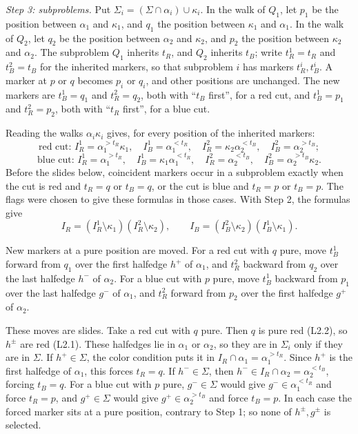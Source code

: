 \documentclass[
  11pt,
]{article}
\newcounter{none} %
\begin{document}
\emph{Step 3: subproblems.} Put
\(\Sigma_i=(\Sigma\cap\alpha_i)\cup\kappa_i\). In the walk of \(Q_1\),
let \(p_1\) be the position between \(\alpha_1\) and \(\kappa_1\), and
\(q_1\) the position between \(\kappa_1\) and \(\alpha_1\). In the walk
of \(Q_2\), let \(q_2\) be the position between \(\alpha_2\) and
\(\kappa_2\), and \(p_2\) the position between \(\kappa_2\) and
\(\alpha_2\). The subproblem \(Q_1\) inherits \(t_R\), and \(Q_2\)
inherits \(t_B\); write \(t_R^1=t_R\) and \(t_B^2=t_B\) for the
inherited markers, so that subproblem \(i\) has markers \(t_R^i,t_B^i\).
A marker at \(p\) or \(q\) becomes \(p_i\) or \(q_i\), and other
positions are unchanged. The new markers are \(t_B^1=q_1\) and
\(t_R^2=q_2\), both with ``\(t_B\) first'', for a red cut, and
\(t_B^1=p_1\) and \(t_R^2=p_2\), both with ``\(t_R\) first'', for a blue
cut.

Reading the walks \(\alpha_i\kappa_i\) gives, for every position of the
inherited markers: \[
\text{red cut: } I^1_R=\alpha_1^{>t_R}\kappa_1,\quad I^1_B=\alpha_1^{<t_R},\quad I^2_R=\kappa_2\alpha_2^{<t_B},\quad I^2_B=\alpha_2^{>t_B};
\] \[
\text{blue cut: } I^1_R=\alpha_1^{>t_R},\quad I^1_B=\kappa_1\alpha_1^{<t_R},\quad I^2_R=\alpha_2^{<t_B},\quad I^2_B=\alpha_2^{>t_B}\kappa_2.
\] Before the slides below, coincident markers occur in a subproblem
exactly when the cut is red and \(t_R=q\) or \(t_B=q\), or the cut is
blue and \(t_R=p\) or \(t_B=p\). The flags were chosen to give these
formulas in those cases. With Step 2, the formulas give \[
I_R=(I^1_R\setminus\kappa_1)(I^2_R\setminus\kappa_2),\qquad I_B=(I^2_B\setminus\kappa_2)(I^1_B\setminus\kappa_1).
\]

New markers at a pure position are moved. For a red cut with \(q\) pure,
move \(t_B^1\) forward from \(q_1\) over the first halfedge \(h^+\) of
\(\alpha_1\), and \(t_R^2\) backward from \(q_2\) over the last halfedge
\(h^-\) of \(\alpha_2\). For a blue cut with \(p\) pure, move \(t_B^1\)
backward from \(p_1\) over the last halfedge \(g^-\) of \(\alpha_1\),
and \(t_R^2\) forward from \(p_2\) over the first halfedge \(g^+\) of
\(\alpha_2\).

These moves are slides. Take a red cut with \(q\) pure. Then \(q\) is
pure red (L2.2), so \(h^\pm\) are red (L2.1). These halfedges lie in
\(\alpha_1\) or \(\alpha_2\), so they are in \(\Sigma_i\) only if they
are in \(\Sigma\). If \(h^+\in\Sigma\), the color condition puts it in
\(I_R\cap\alpha_1=\alpha_1^{>t_R}\). Since \(h^+\) is the first halfedge
of \(\alpha_1\), this forces \(t_R=q\). If \(h^-\in\Sigma\), then
\(h^-\in I_R\cap\alpha_2=\alpha_2^{<t_B}\), forcing \(t_B=q\). For a
blue cut with \(p\) pure, \(g^-\in\Sigma\) would give
\(g^-\in\alpha_1^{<t_R}\) and force \(t_R=p\), and \(g^+\in\Sigma\)
would give \(g^+\in\alpha_2^{>t_B}\) and force \(t_B=p\). In each case
the forced marker sits at a pure position, contrary to Step 1; so none
of \(h^\pm,g^\pm\) is selected.
\end{document}
